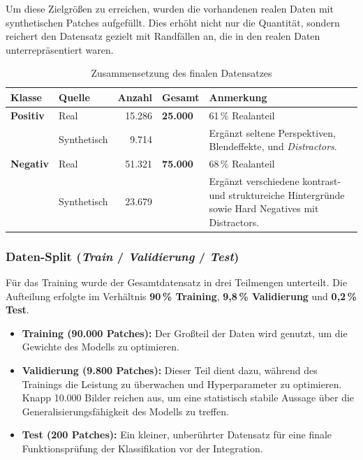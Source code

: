 \documentclass[
    a4paper,        %
    11pt,           %
    ngerman,        %
    parskip=half,   %
    listof=totoc,   %
    bibliography=totoc %
]{scrartcl}
\begin{document}
Um diese Zielgrößen zu erreichen, wurden die vorhandenen realen Daten mit synthetischen Patches aufgefüllt. Dies erhöht nicht nur die Quantität, sondern reichert den Datensatz gezielt mit Randfällen an, die in den realen Daten unterrepräsentiert waren.

\begin{table}[H]
    \centering
    \caption{Zusammensetzung des finalen Datensatzes}
    \label{tab:final_dataset}
    \begin{tabular}{llrlp{5cm}}
        \toprule
        \textbf{Klasse} & \textbf{Quelle} & \textbf{Anzahl} & \textbf{Gesamt} & \textbf{Anmerkung} \\
        \midrule
        \textbf{Positiv} & Real & 15.286 & \textbf{25.000} & 61\,\% Realanteil \\
         & Synthetisch & 9.714 & & Ergänzt seltene Perspektiven, Blendeffekte, und \textit{Distractors}. \\
        \midrule
        \textbf{Negativ} & Real & 51.321 & \textbf{75.000} & 68\,\% Realanteil \\
         & Synthetisch & 23.679 & & Ergänzt verschiedene kontrast- und struktureiche Hintergründe sowie Hard Negatives mit Distractors. \\
        \bottomrule
    \end{tabular}
\end{table}

\subsubsection{Daten-Split (\textit{Train} / \textit{Validierung} / \textit{Test})}
Für das Training wurde der Gesamtdatensatz in drei Teilmengen unterteilt. Die Aufteilung erfolgte im Verhältnis \textbf{90\,\% Training}, \textbf{9,8\,\% Validierung} und \textbf{0,2\,\% Test}.

\begin{itemize}
    \item \textbf{Training (90.000 Patches):} Der Großteil der Daten wird genutzt, um die Gewichte des Modells zu optimieren.
    \item \textbf{Validierung (9.800 Patches):} Dieser Teil dient dazu, während des Trainings die Leistung zu überwachen und Hyperparameter zu optimieren. Knapp 10.000 Bilder reichen aus, um eine statistisch stabile Aussage über die Generalisierungsfähigkeit des Modells zu treffen.
    \item \textbf{Test (200 Patches):} Ein kleiner, unberührter Datensatz für eine finale Funktionsprüfung der Klassifikation vor der Integration.
\end{itemize}
\end{document}
